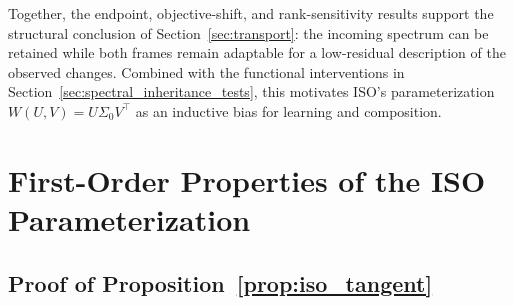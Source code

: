\documentclass[11pt, a4paper]{utda}
\theoremstyle{plain}
\theoremstyle{definition}
\theoremstyle{remark}
\begin{document}
Together, the endpoint, objective-shift, and rank-sensitivity
results support the structural conclusion of
Section~\ref{sec:transport}: the incoming spectrum can be retained
while both frames remain adaptable for a low-residual description
of the observed changes.
Combined with the functional interventions in
Section~\ref{sec:spectral_inheritance_tests}, this motivates
ISO's parameterization $W(U,V)=U\Sigma_0V^\top$ as an
inductive bias for learning and composition.

\section{First-Order Properties of the ISO Parameterization}
\label{app:iso_first_order}

\subsection{Proof of Proposition~\ref{prop:iso_tangent}}
\label{app:proof_iso_tangent}
\end{document}
